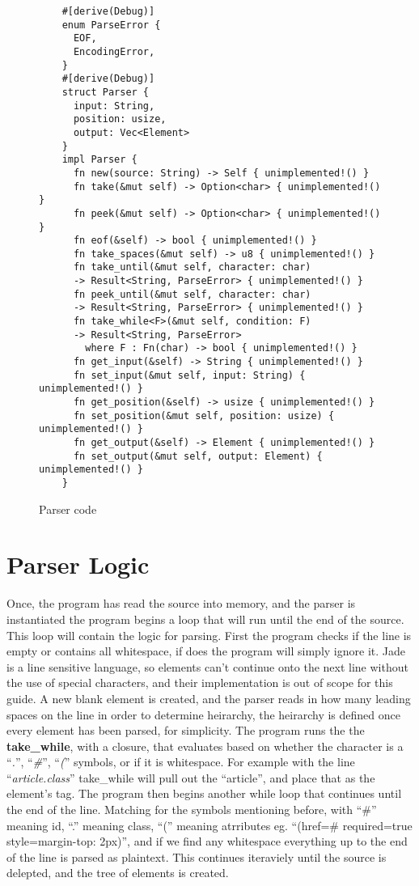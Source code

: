 \begin{figure}[ht!]
    \small
  \begin{verbatim}
    #[derive(Debug)]
    enum ParseError {
      EOF,
      EncodingError,
    }
    #[derive(Debug)]
    struct Parser {
      input: String,
      position: usize,
      output: Vec<Element>
    }
    impl Parser {
      fn new(source: String) -> Self { unimplemented!() }
      fn take(&mut self) -> Option<char> { unimplemented!() }
      fn peek(&mut self) -> Option<char> { unimplemented!() }
      fn eof(&self) -> bool { unimplemented!() }
      fn take_spaces(&mut self) -> u8 { unimplemented!() }
      fn take_until(&mut self, character: char) 
      -> Result<String, ParseError> { unimplemented!() }
      fn peek_until(&mut self, character: char) 
      -> Result<String, ParseError> { unimplemented!() }
      fn take_while<F>(&mut self, condition: F) 
      -> Result<String, ParseError> 
        where F : Fn(char) -> bool { unimplemented!() }
      fn get_input(&self) -> String { unimplemented!() }
      fn set_input(&mut self, input: String) { unimplemented!() }
      fn get_position(&self) -> usize { unimplemented!() }
      fn set_position(&mut self, position: usize) { unimplemented!() }
      fn get_output(&self) -> Element { unimplemented!() }
      fn set_output(&mut self, output: Element) { unimplemented!() }
    }
  \end{verbatim}
  \caption{Parser code}
\end{figure}
\newpage
\newpage
\section{Parser Logic}
Once, the program has read the source into memory, and the parser is instantiated the program begins a loop that will run until the end of the source. This loop will contain the logic for parsing. First the program checks if the line is empty or contains all whitespace, if does the program will simply ignore it. Jade is a line sensitive language, so elements can't continue onto the next line without the use of special characters, and their implementation is out of scope for this guide. A new blank element is created, and the parser reads in how many leading spaces on the line in order to determine heirarchy, the heirarchy is defined once every element has been parsed, for simplicity. The program runs the the \textbf{take\_while}, with a closure, that evaluates based on whether the character is a ``\textit{.}'', ``\textit{\#}'', ``\textit{(}'' symbols, or if it is whitespace. For example with the line ``\textit{article.class}'' take\_while will pull out the ``article'', and place that as the element's tag. The program then begins another while loop that continues until the end of the line. Matching for the symbols mentioning before, with ``\#'' meaning id, ``.'' meaning class, ``('' meaning atrributes eg. ``(href=\textquotedbl{}\#\textquotedbl{} required=\textquotedbl{}true\textquotedbl{} style=\textquotedbl{}margin-top: 2px\textquotedbl{})'', and if we find any whitespace everything up to the end of the line is parsed as plaintext. This continues iteraviely until the source is delepted, and the tree of elements is created.


